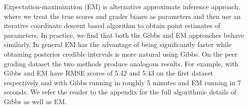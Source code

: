 
Expectation-maximization (EM) is alternative approximate inference approach, where we treat the true scores and grader biases as parameters
and then use an iterative coordinate descent based algorithm to obtain point estimates of parameters.  
In practice, we find that both the Gibbs and EM approaches behave
similarly.  In general EM has the advantage of being significantly faster while obtaining posterior credible intervals is more natural using Gibbs. On the peer grading dataset the two methods produce analogous results. For example, \PGone with Gibbs and EM have RMSE scores of 5.42 and 5.43 on the first dataset respectively and with Gibbs running in roughly 5 minutes and EM running in 7 seconds.
We refer the reader to the appendix for the full algorithmic details of Gibbs as well as EM.


